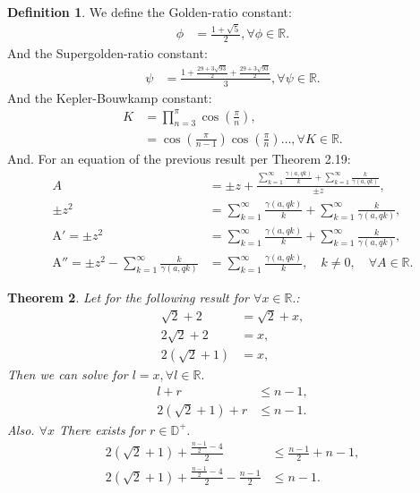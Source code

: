 \documentclass[10pt]{article}
\theoremstyle{plain}
\newtheorem{theorem}{Theorem}[section]
\theoremstyle{definition}
\newtheorem{definition}[theorem]{Definition}
\theoremstyle{remark}
\begin{document}
\begin{definition}
	We define the Golden-ratio constant:
	\begin{align*}
		\phi &= \frac{1+\sqrt{5}}{2}, \forall \phi \in \mathbb{R}.
	\end{align*}
	And the Supergolden-ratio constant:
	\begin{align*}
		\psi &= \frac{1+\frac{29+3\sqrt{93}}{2}+\frac{29+3\sqrt{93}}{2}}{3}, \forall \psi \in \mathbb{R}.
	\end{align*}
	And the Kepler-Bouwkamp constant:
	\begin{align*}
		K &= \prod_{n=3}^{\pi} \cos(\frac{\pi}{n}),\\
		&= \cos(\frac{\pi}{n-1}) \cos(\frac{\pi}{n}) \dots, \forall K \in \mathbb{R}.
	\end{align*}
	And. For an equation of the previous result per Theorem 2.19:
	\begin{align*}
		A &= \pm z + \frac{\sum_{k=1}^{\infty} \frac{\gamma(a, qk)}{k} + \sum_{k=1}^{\infty}\frac{k}{\gamma(a, qk)}}{\pm z},\\
		\pm z^2 &= \sum_{k=1}^{\infty} \frac{\gamma(a, qk)}{k} + \sum_{k=1}^{\infty}\frac{k}{\gamma(a, qk)},\\
		\mathrm{A}' = \pm z^2 &= \sum_{k=1}^{\infty} \frac{\gamma(a, qk)}{k} + \sum_{k=1}^{\infty}\frac{k}{\gamma(a, qk)},\\
		\mathrm{A}'' = \pm z^{2} - \sum_{k=1}^{\infty}\frac{k}{\gamma(a, qk)} &= \sum_{k=1}^{\infty} \frac{\gamma(a, qk)}{k}, \quad k \neq 0, \quad \forall A \in \mathbb{R}.
	\end{align*}
\end{definition}

\begin{theorem}
	Let for the following result for $\forall x \in \mathbb{R}.$:
	\begin{align*}
		\sqrt{2}+2&=\sqrt{2} + x,\\
		2\sqrt{2}+2 &=x,\\
		2(\sqrt{2} + 1) &= x,
	\end{align*}
	Then we can solve for $l=x, \forall l \in \mathbb{R}.$
	\begin{align*}
		l + r &\leq n - 1,\\
		2(\sqrt{2} + 1) + r &\leq n - 1.
	\end{align*}
	Also. $\forall x$ There exists for $r \in \mathbb{D}^{+}.$
	\begin{align*}
		2(\sqrt{2} + 1) + \frac{\frac{n - 1}{2} - 4}{2}  &\leq \frac{n - 1}{2} + n - 1,\\
		2(\sqrt{2} + 1) + \frac{\frac{n - 1}{2} - 4}{2} - \frac{n - 1}{2} &\leq n - 1.
	\end{align*}
\end{theorem}
\end{document}

